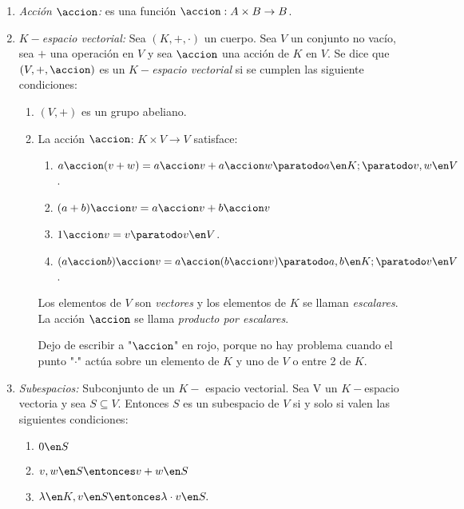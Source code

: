 \begin{enumerate}[label=\tiny\purple{\faIcon{snowman}}]
  \item \textit{Acción $\accion$:} es una función $\accion : A \times B \to B$.

  \item \textit{$K-$espacio vectorial:} Sea $(K, +, \cdot)$ un cuerpo. Sea $V$ un conjunto no vacío, sea $+$ una operación en
        $V$ y sea $\accion$ una acción de $K$ en $V$. Se dice que $(V, +, \accion)$ es un $K-$\textit{espacio vectorial} si se
        cumplen las siguiente condiciones:

        \begin{enumerate}[label=\roman*)]
          \item $(V, +)$ es un grupo abeliano.

          \item La acción $\accion$: $K \times V \to V$ satisface:
                \begin{enumerate}[label=\alph*)]
                  \item $a \accion (v + w) = a \accion v + a \accion w  \paratodo a \en K; \paratodo v, w \en V$.
                  \item $(a + b) \accion v = a \accion v  + b \accion v$
                  \item $1 \accion v = v \paratodo v \en V$.
                  \item $(a \accion b) \accion v = a \accion (b \accion v) \paratodo a, b \en K; \paratodo v \en V$.
                \end{enumerate}

                Los elementos de $V$ son \textit{vectores} y los elementos de $K$ se llaman \textit{escalares}. La acción $\accion$
                se llama \textit{producto por escalares}.

                Dejo de escribir a "$\accion$" en rojo, porque no hay problema cuando el punto "$\cdot$"
                actúa sobre un elemento de $K$ y uno de $V$ o entre  2 de $K$.
        \end{enumerate}

  \item \textit{Subespacios:} Subconjunto de un $K-$ espacio vectorial. Sea V un $K-$espacio vectoria y sea $S \subseteq V$. Entonces $S$ es
        un subespacio de $V$ si y solo si valen las siguientes condiciones:
        \begin{enumerate}[label=\roman*)]
          \item $0 \en S$
          \item $v, w \en S \entonces v + w \en S$
          \item $\lambda \en K, v \en S \entonces \lambda \cdot v \en S.$
        \end{enumerate}
\end{enumerate}

